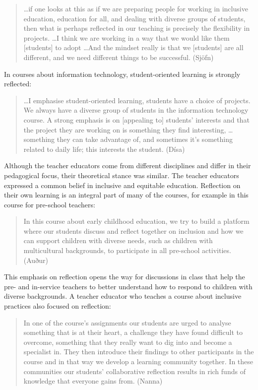 \documentclass[output=paper]{langscibook}
\begin{document}
\begin{quote}
…if one looks at this as if we are preparing people for working in inclusive education, education for all, and dealing with diverse groups of students, then what is perhaps reflected in our teaching is precisely the flexibility in projects. …I think we are working in a way that we would like them [students] to adopt …And the mindset really is that we [students] are all different, and we need different things to be successful. (Sjöfn)
\end{quote}

In courses about information technology, student-oriented learning is strongly reflected:

\begin{quote}
…I emphasise student-oriented learning, students have a choice of projects. We always have a diverse group of students in the information technology course. A strong emphasis is on [appealing to] students’ interests and that the project they are working on is something they find interesting, …something they can take advantage of, and sometimes it's something related to daily life; this interests the student. (Dísa)
\end{quote}

Although the teacher educators come from different disciplines and differ in their pedagogical focus, their theoretical stance was similar. The teacher educators expressed a common belief in inclusive and equitable education. Reflection on their own learning is an integral part of many of the courses, for example in this course for pre-school teachers:

\begin{quote}
In this course about early childhood education, we try to build a platform where our students discuss and reflect together on inclusion and how we can support children with diverse needs, such as children with multicultural backgrounds, to participate in all pre-school activities. (Auður)
\end{quote}

This emphasis on reflection opens the way for discussions in class that help the pre- and in-service teachers to better understand how to respond to children with diverse backgrounds. A teacher educator who teaches a course about inclusive practices also focused on reflection:

\begin{quote}
In one of the course’s assignments our students are urged to analyse something that is at their heart, a challenge they have found difficult to overcome, something that they really want to dig into and become a specialist in. They then introduce their findings to other participants in the course and in that way we develop a learning community together. In these communities our students’ collaborative reflection results in rich funds of knowledge that everyone gains from. (Nanna) 
\end{quote}
\end{document}
